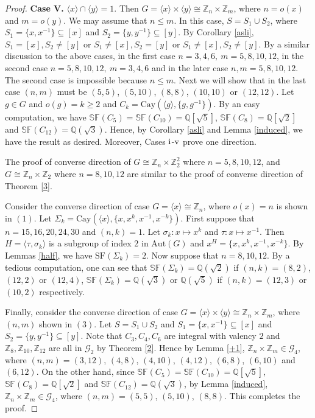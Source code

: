 \documentclass[10pt,a4paper]{amsart}
\def \geq {\geqslant}
\def \leq {\leqslant}
\begin{document}
\begin{proof}
		
		\textbf{Case V.} $\langle x\rangle\cap\langle y\rangle=1$. Then $G=\langle x\rangle\times\langle y\rangle\cong\mathbb Z_n\times\mathbb Z_m$, where $n=o(x)$ and $m=o(y)$. We may assume that $n\leq m$. In this case, $S=S_1\cup S_2$, where $S_1=\{x,x^{-1}\}\subseteq [x]$ and $S_2=\{y,y^{-1}\}\subseteq [y]$. By Corollary \ref{asli}, $S_1=[x], S_2\neq [y]$ or
		$S_1\neq [x],S_2=[y]$ or $S_1\neq [x],S_2\neq [y]$. By a similar discussion to the above cases, in the first case $n=3,4,6,~m=5,8,10,12$, in the second case $n=5,8,10,12,~m=3,4,6$ and in the later case $n,m=5,8,10,12$.
		The second case is impossible because $n\leq m$. 
		Next we will show that in the last case $(n,m)$ must be $(5,5)$, $(5,10)$, $(8,8)$, $(10,10)$ or $(12,12)$.	
		Let $g\in G$ and $o(g)=k\geq 2$ and $C_k=\mathrm{Cay}(\langle g\rangle,\{g,g^{-1}\})$.
		By an easy computation, we have $\mathbb{SF}(C_{5})=\mathbb{SF}(C_{10})=\mathbb Q[\sqrt{5}]$, $\mathbb{SF}(C_8)=\mathbb Q[\sqrt{2}]$ and $\mathbb{SF}(C_{12})=\mathbb Q(\sqrt{3})$. Hence, by Corollary \ref{asli} and Lemma \ref{induced}, we have the result as desired. Moreover, Cases $\mathrm{ \uppercase\expandafter{\romannumeral1}}$-$\mathrm{\uppercase\expandafter{\romannumeral5} }$ prove one direction.
		
		The proof of converse direction of $G\cong\mathbb Z_n\times\mathbb{Z}_2^2$ where $n=5,8,10,12$, and $G\cong\mathbb Z_n\times\mathbb{Z}_2$ where $n=8,10,12$ are similar to the proof of converse direction of Theorem \ref{3}.
		
		Consider the converse direction of case $G=\langle x\rangle \cong \mathbb Z_n$, where $o(x)=n$ is shown in $(1)$.
		Let $\Sigma_{k}=\mathrm{Cay}(\langle x\rangle,\{x,x^k,x^{-1},x^{-k}\})$. 
		First suppose that $n=15,16,20,24,30$ and $(n,k)=1$. 
		Let $\sigma_k:x\mapsto x^k$ and $\tau:x\mapsto x^{-1}$.
		Then $H=\langle \tau,\sigma_k\rangle$ is a subgroup of index $2$ in $\mathrm{Aut}(G)$ and $x^H=\{x,x^k,x^{-1},x^{-k}\}$.
		By Lemmas \ref{half}, we have $\mathrm{SF}(\Sigma_{k})=2$.
		Now suppose that $n=8,10,12$.
		By a tedious computation, one can see that $\mathbb{SF}(\Sigma_{k})=\mathbb Q(\sqrt{2})$ if $(n,k)=(8,2)$, $(12,2)$ or $(12,4)$,
		$\mathbb{SF}(\Sigma_{k})=\mathbb Q(\sqrt{3})$ or $\mathbb Q(\sqrt{5})$ if $(n,k)=(12,3)$ or $(10,2)$ respectively.	
		
		Finally, consider the converse direction of case $G=\langle x\rangle \times \langle y\rangle \cong \mathbb Z_n\times\mathbb Z_m$, where $(n,m)$ shown in $(3)$.
		Let $S=S_1\cup S_2$ and $S_1=\{x,x^{-1}\}\subseteq [x]$ and $S_2=\{y,y^{-1}\}\subseteq [y]$.
		Note that $C_3,C_4,C_6$ are integral with valency $2$ and $\mathbb{Z}_{8},\mathbb{Z}_{10},\mathbb{Z}_{12}$ are all in $\mathcal{G}_2$ by Theorem \ref{2}.
		Hence by Lemma \ref{+1}, $\mathbb Z_n\times\mathbb Z_m \in \mathcal{G}_4$, where $(n,m)=(3,12)$, $(4,8)$, $(4,10)$, $(4,12)$, $(6,8)$, $(6,10)$ and $(6,12)$.
		On the other hand, since $\mathbb{SF}(C_{5})=\mathbb{SF}(C_{10})=\mathbb Q[\sqrt{5}]$, $\mathbb{SF}(C_8)=\mathbb Q[\sqrt{2}]$ and $\mathbb{SF}(C_{12})=\mathbb Q(\sqrt{3})$, 
		by Lemma \ref{induced}, $\mathbb Z_n\times\mathbb Z_m \in \mathcal{G}_4$, where $(n,m)=(5,5)$, $(5,10)$, $(8,8)$. 
		This completes the proof.
	\end{proof}
\end{document}
